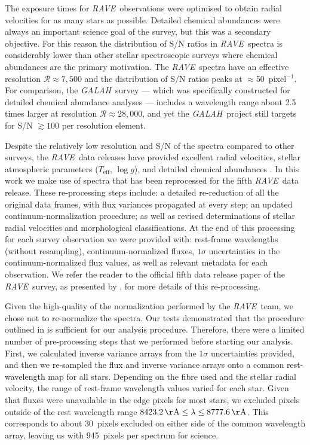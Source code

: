 \documentclass[preprint]{aastex61}
\newcommand{\acronym}[1]{{\small{#1}}}
\newcommand{\project}[1]{\textsl{#1}}
\newcommand{\rave}{\project{\acronym{RAVE}}}
\newcommand{\galah}{\project{\acronym{GALAH}}}
\newcommand{\teff}{T_{\mathrm{eff}}}
\newcommand{\logg}{\log g}
\begin{document}
The exposure times for \rave\ observations were optimised to obtain radial 
velocities for as many stars as possible.  Detailed chemical abundances were
always an important science goal of the survey, but this was a secondary objective.  
For this reason the distribution of S/N ratios in \rave\ spectra is considerably 
lower than other stellar spectroscopic surveys where chemical abundances are the 
primary motivation.  The \rave\ spectra have an effective resolution 
$\mathcal{R} \approx 7{,}500$ and the distribution of S/N ratios peaks at 
$\approx$50~pixel$^{-1}$.  For comparison, the \galah\ survey 
\citep{DeSilva_2015} --- which was specifically constructed for detailed chemical 
abundance analyses --- includes a wavelength range about 2.5 times larger at 
resolution $\mathcal{R} \approx 28{,}000$, and yet the \galah\ project still 
targets for S/N $\gtrsim100$ per resolution element.


Despite the relatively low resolution and S/N of the spectra compared to other
surveys, the \rave\ data releases have provided excellent radial velocities, 
stellar atmospheric parameters ($\teff$, $\logg$), and detailed chemical abundances
\citep{Steinmetz_2006,Zwitter_2008,Siebert_2011,Boeche_2011,Kordopatis_2013,
Kunder_2016}.  In this work we make use of spectra that has been reprocessed for 
the fifth \rave\ data release.  These re-processing steps include: a detailed 
re-reduction of all the original data frames, with flux variances propagated at 
every step; an updated continuum-normalization procedure; as well as revised 
determinations of stellar radial velocities and morphological classifications. 
At the end of this processing for each survey observation we were provided with:
rest-frame wavelengths (without resampling), continuum-normalized fluxes, $1\sigma$
uncertainties in the continuum-normalized flux values, as well as relevant metadata
for each observation.  We refer the reader to the official fifth data release paper
of the \rave\ survey, as presented by \citet{Kunder_2016}, for more details of this
re-processing.


Given the high-quality of the normalization performed by the \rave\ team, we chose
not to re-normalize the spectra.  Our tests demonstrated that the procedure 
outlined in \citet{Kunder_2016} is sufficient for our analysis procedure. Therefore,
there were a limited number of pre-processing steps that we performed before starting
our analysis.  First, we calculated inverse variance arrays from the $1\sigma$ 
uncertainties provided, and then we re-sampled the flux and inverse variance
arrays onto a common rest-wavelength map for all stars.  Depending on the fibre 
used and the stellar radial velocity, the range of rest-frame wavelength values
varied for each star.  Given that fluxes were unavailable in the edge pixels for 
most stars, we excluded pixels outside of the rest wavelength range 
$8423.2\,{\rm \AA} \le \lambda \le 8777.6\,{\rm \AA}$.  This corresponds to about
30~pixels excluded on either side of the common wavelength array, leaving us with
945~pixels per spectrum for science.  
\end{document}
